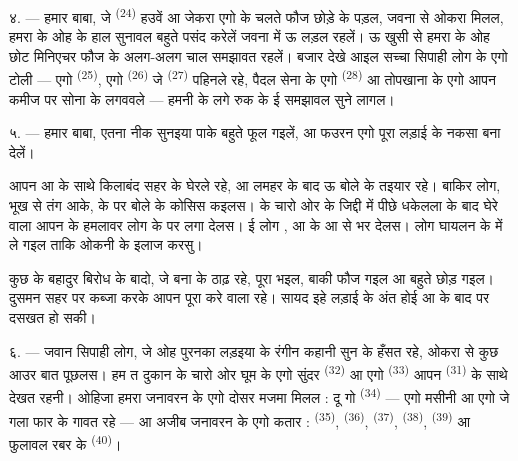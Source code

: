 ४. --- हमार बाबा, जे  \textsuperscript{(24)} हउवें आ
जेकरा एगो  के चलते फौज छोड़े के पड़ल, जवना से ओकरा
 मिलल, हमरा के ओह  के हाल सुनावल बहुते
पसंद करेलें जवना में ऊ लड़ल रहलें। ऊ खुसी से हमरा के ओह छोट मिनिएचर
फौज के अलग-अलग चाल समझावत रहलें। बजार देखे आइल सच्चा सिपाही लोग के एगो
टोली — एगो  \textsuperscript{(25)}, एगो
 \textsuperscript{(26)} जे 
\textsuperscript{(27)} पहिनले रहे, पैदल सेना के एगो 
\textsuperscript{(28)} आ तोपखाना के एगो  आपन कमीज पर सोना के
 लगववले — हमनी के लगे रुक के ई समझावल सुने लागल।

५. --- हमार बाबा, एतना नीक सुनइया पाके बहुते फूल गइलें, आ फउरन एगो
पूरा लड़ाई के नकसा बना देलें।

आपन  आ  के साथे किलाबंद सहर के  घेरले रहे, आ लमहर  के बाद ऊ  बोले
के तइयार रहे। बाकिर  लोग, भूख से तंग आके,  के  पर  बोले के कोसिस कइलस।
 के चारो ओर के जिद्दी  में 
पीछे धकेलला के बाद  घेरे वाला आपन 
के  हमलावर लोग के  पर लगा देलस। ई लोग
, आ  के  आ 
से भर देलस।  लोग घायलन के  में
ले गइल ताकि  ओकनी के इलाज करसु।

कुछ  के बहादुर बिरोध के बादो, जे  बना के
ठाढ़ रहे,  पूरा भइल, बाकी फौज  गइल आ बहुते
 छोड़ गइल। दुसमन सहर पर कब्जा करके आपन  पूरा
करे वाला रहे। सायद इहे लड़ाई के अंत होई आ  के बाद
 पर दसखत हो सकी।

\VUsaut{4.4mm}
\VUsaut{2.8mm}

६. --- जवान सिपाही लोग, जे ओह पुरनका लड़इया के रंगीन कहानी सुन के
हँसत रहे, ओकरा से कुछ आउर बात पूछलस। हम त दुकान के चारो ओर घूम के एगो
सुंदर  \textsuperscript{(32)} आ एगो 
\textsuperscript{(33)} आपन  \textsuperscript{(31)} के साथे देखत
रहनी। ओहिजा हमरा जनावरन के एगो दोसर मजमा मिलल : दू गो  \textsuperscript{(34)} — एगो मसीनी  आ एगो
 जे गला फार के गावत रहे — आ अजीब जनावरन के एगो कतार :
 \textsuperscript{(35)},  \textsuperscript{(36)},
 \textsuperscript{(37)},  \textsuperscript{(38)},
 \textsuperscript{(39)} आ फुलावल रबर के 
\textsuperscript{(40)}।

